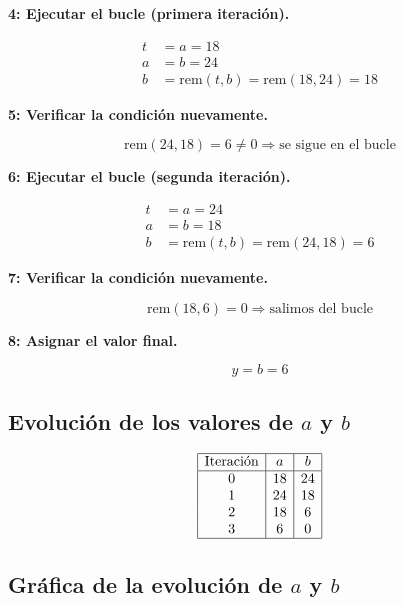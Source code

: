 \documentclass[12pt]{article}
\begin{document}
\textbf{ 4: Ejecutar el bucle (primera iteración).}

\[
\begin{aligned}
t &= a = 18 \\
a &= b = 24 \\
b &= \text{rem}(t, b) = \text{rem}(18, 24) = 18
\end{aligned}
\]

\textbf{ 5: Verificar la condición nuevamente.}

\[
\text{rem}(24, 18) = 6 \neq 0 \Rightarrow \text{se sigue en el bucle}
\]

\textbf{ 6: Ejecutar el bucle (segunda iteración).}

\[
\begin{aligned}
t &= a = 24 \\
a &= b = 18 \\
b &= \text{rem}(t, b) = \text{rem}(24, 18) = 6
\end{aligned}
\]

\textbf{ 7: Verificar la condición nuevamente.}

\[
\text{rem}(18, 6) = 0 \Rightarrow \text{salimos del bucle}
\]

\textbf{ 8: Asignar el valor final.}

\[
y = b = \boxed{6}
\]

\subsection*{Evolución de los valores de \( a \) y \( b \)}

\[
\begin{array}{|c|c|c|}
\hline
\text{Iteración} & a & b \\ \hline
0 & 18 & 24 \\
1 & 24 & 18 \\
2 & 18 & 6 \\
3 & 6 & 0 \\ \hline
\end{array}
\]

\subsection*{Gráfica de la evolución de \( a \) y \( b \)}

\begin{center}
\end{center}
\end{document}
